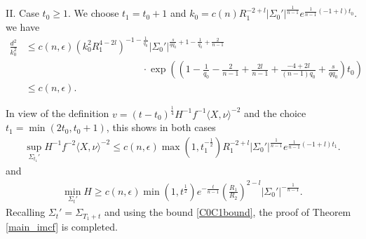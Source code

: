\documentclass[12pt,twoside]{article}
\theoremstyle{plain}
\theoremstyle{definition}
\theoremstyle{remark}
\newcommand{\lt}{\left}
\newcommand{\rt}{\right}
\numberwithin{equation}{section}
\begin{document}
II. Case $t_0 \ge 1$. We choose $t_1 = t_0 + 1$ and $k_0 = c(n) R_1^{-2 + l} |\Sigma_0'|^{\frac{1}{n-1}} e^{\frac{1}{n-1}(-1+l) t_0}$. 
we have
\begin{align*}
\frac{d^2}{k_0^2} &\le c(n,\epsilon) (k_0^2 R_1^{4-2l})^{-1-\frac{1}{q_0}} |\Sigma_0'|^{\frac{s}{qq_0} + 1 - \frac{1}{q_0} + \frac{2}{n-1}} \\
&\hspace{5cm} \cdot \exp \lt( \lt( 1 - \frac{1}{q_0} - \frac{2}{n-1} + \frac{2l}{n-1} + \frac{-4+2l}{(n-1)q_0} + \frac{s}{qq_0} \rt) t_0 \rt)\\
&\le c(n,\epsilon).
\end{align*}



In view of the definition $v = (t-t_0)^{\frac{1}{4}} H^{-1} f^{-1} \langle X,\nu \rangle^{-2}$ and the choice $t_1 = \min (2t_0,t_0+1)$, this shows in both cases
\begin{align*}
\sup_{\Sigma_{t_1}'} H^{-1} f^{-2} \langle X,\nu \rangle^{-2} \le c(n,\epsilon) \max(1, t_1^{-\frac{1}{2}}) R_1^{-2 + l} |\Sigma_0'|^{\frac{1}{n-1}} e^{\frac{1}{n-1} (-1 + l) t_1}.
\end{align*} 
and \begin{align*}
\min_{\Sigma_t'} H \ge c(n,\epsilon) \min(1,t^{\frac{1}{2}}) e^{-\frac{t}{n-1}} \lt( \frac{R_1}{R_2}\rt)^{2-l} |\Sigma_0'|^{-\frac{1}{n-1}}.
\end{align*}
Recalling $\Sigma_t' = \Sigma_{T_1 + t}$ and using the bound \eqref{C0C1bound}, the proof of Theorem \ref{main_imcf} is completed.
\end{document}
